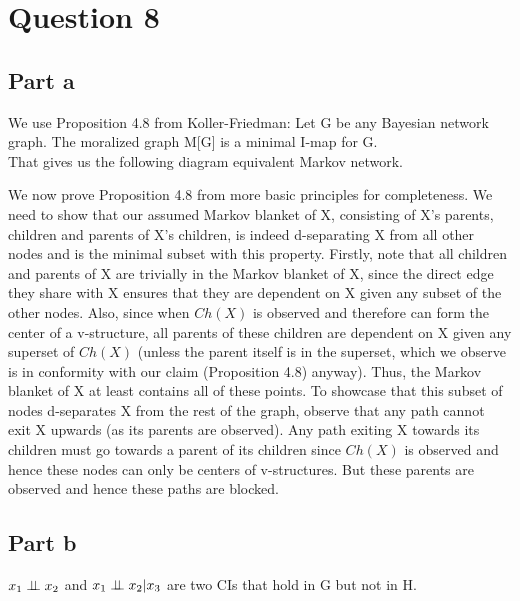 \section{Question 8}
\subsection{Part a}
We use Proposition 4.8 from Koller-Friedman: Let G be any Bayesian network graph. The moralized graph M[G] is a minimal I-map for G.\\
That gives us the following diagram equivalent Markov network.\\

We now prove Proposition 4.8 from more basic principles for completeness. We need to show that our assumed Markov blanket of X, consisting of X's parents, children and parents of X's children, is indeed d-separating X from all other nodes and is the minimal subset with this property. Firstly, note that all children and parents of X are trivially in the Markov blanket of X, since the direct edge they share with X ensures that they are dependent on X given any subset of the other nodes. Also, since when $Ch(X)$ is observed and therefore can form the center of a v-structure, all parents of these children are dependent on X given any superset of $Ch(X)$ (unless the parent itself is in the superset, which we observe is in conformity with our claim (Proposition 4.8) anyway). Thus, the Markov blanket of X at least contains all of these points. To showcase that this subset of nodes d-separates X from the rest of the graph, observe that any path cannot exit X upwards (as its parents are observed). Any path exiting X towards its children must go towards a parent of its children since $Ch(X)$ is observed and hence these nodes can only be centers of v-structures. But these parents are observed and hence these paths are blocked. 

\subsection{Part b}
$x_1 \perp\mkern-9.5mu\perp x_2$ and $x_1 \perp\mkern-9.5mu\perp x_2 | x_3$ are two CIs that hold in G but not in H.